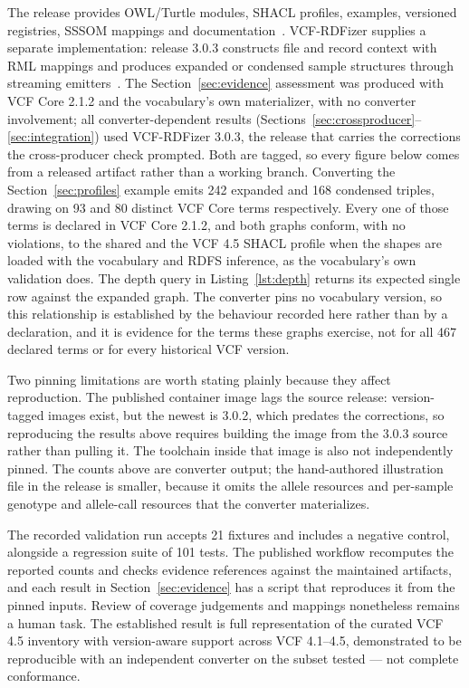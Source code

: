 \documentclass{ceurart}
\begin{document}
The release provides OWL/Turtle modules, SHACL profiles, examples, versioned registries, SSSOM mappings and documentation~\cite{vcfc210}. 
VCF-RDFizer supplies a separate implementation: release 3.0.3 constructs file and record context with RML mappings and produces expanded or condensed sample structures through streaming emitters~\cite{vcfrConverter2026}. 
The Section~\ref{sec:evidence} assessment was produced with VCF Core 2.1.2 and the vocabulary's own materializer, with no converter involvement; all converter-dependent results (Sections~\ref{sec:crossproducer}--\ref{sec:integration}) used VCF-RDFizer 3.0.3, the release that carries the corrections the cross-producer check prompted. 
Both are tagged, so every figure below comes from a released artifact rather than a working branch. 
Converting the Section~\ref{sec:profiles} example emits 242 expanded and 168 condensed triples, drawing on 93 and 80 distinct VCF Core terms respectively. 
Every one of those terms is declared in VCF Core 2.1.2, and both graphs conform, with no violations, to the shared and the VCF 4.5 SHACL profile when the shapes are loaded with the vocabulary and RDFS inference, as the vocabulary's own validation does. 
The depth query in Listing~\ref{lst:depth} returns its expected single row against the expanded graph. 
The converter pins no vocabulary version, so this relationship is established by the behaviour recorded here rather than by a declaration, and it is evidence for the terms these graphs exercise, not for all 467 declared terms or for every historical VCF version.

Two pinning limitations are worth stating plainly because they affect reproduction. 
The published container image lags the source release: version-tagged images exist, but the newest is 3.0.2, which predates the corrections, so reproducing the results above requires building the image from the 3.0.3 source rather than pulling it. The toolchain inside that image is also not independently pinned. 
The counts above are converter output; the hand-authored illustration file in the release is smaller, because it omits the allele resources and per-sample genotype and allele-call resources that the converter materializes.

The recorded validation run accepts 21 fixtures and includes a negative control, alongside a regression suite of 101 tests. 
The published workflow recomputes the reported counts and checks evidence references against the maintained artifacts, and each result in Section~\ref{sec:evidence} has a script that reproduces it from the pinned inputs. 
Review of coverage judgements and mappings nonetheless remains a human task. 
The established result is full representation of the curated VCF 4.5 inventory with version-aware support across VCF 4.1--4.5, demonstrated to be reproducible with an independent converter on the subset tested --- not complete conformance.
\end{document}
